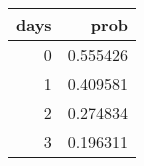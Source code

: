 \begin{tabular}{rr}
\toprule
 days &      prob \\
\midrule
    0 &  0.555426 \\
    1 &  0.409581 \\
    2 &  0.274834 \\
    3 &  0.196311 \\
\bottomrule
\end{tabular}
